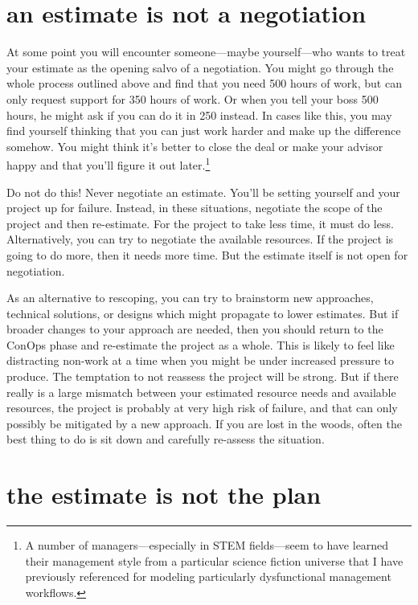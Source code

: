 \documentclass[12pt,oneside]{book}
\begin{document}
\section*{an estimate is not a negotiation}
\label{scrivauto:45}

At some point you will encounter someone---maybe yourself---who wants to treat your estimate as the opening salvo of a negotiation. You might go through the whole process outlined above and find that you need 500 hours of work, but can only request support for 350 hours of work. Or when you tell your boss 500 hours, he might ask if you can do it in 250 instead. In cases like this, you may find yourself thinking that you can just work harder and make up the difference somehow. You might think it's better to close the deal or make your advisor happy and that you'll figure it out later.\footnote{
A number of managers—especially in STEM fields—seem to have learned their management style from a particular science fiction universe that I have previously referenced for modeling particularly dysfunctional management workflows.}

Do not do this! Never negotiate an estimate. You'll be setting yourself and your project up for failure. Instead, in these situations, negotiate the scope of the project and then re-estimate. For the project to take less time, it must do less. Alternatively, you can try to negotiate the available resources. If the project is going to do more, then it needs more time. But the estimate itself is not open for negotiation.

As an alternative to rescoping, you can try to brainstorm new approaches, technical solutions, or designs which might propagate to lower estimates. But if broader changes to your approach are needed, then you should return to the ConOps phase and re-estimate the project as a whole. This is likely to feel like distracting non-work at a time when you might be under increased pressure to produce. The temptation to not reassess the project will be strong. But if there really is a large mismatch between your estimated resource needs and available resources, the project is probably at very high risk of failure, and that can only possibly be mitigated by a new approach. If you are lost in the woods, often the best thing to do is sit down and carefully re-assess the situation.

\section*{the estimate is not the plan}
\label{scrivauto:46}
\end{document}
